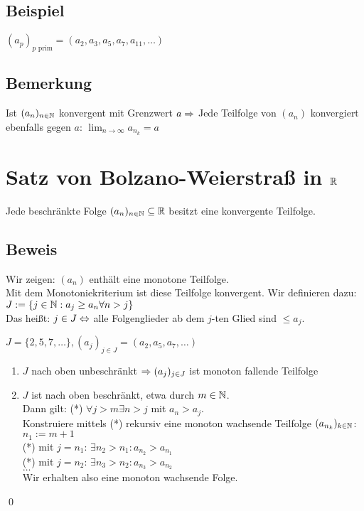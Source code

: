 \subsection*{Beispiel}
$(a_p)_{p \text{ prim}} = (a_2, a_3, a_5, a_7, a_{11}, \hdots)$

\subsection*{Bemerkung}
Ist $(a_n)_{n \in \mathbb{N}}$ konvergent mit Grenzwert $a \Rightarrow$ Jede Teilfolge von $(a_n)$ konvergiert ebenfalls gegen $a$: $\lim_{n \to \infty} a_{n_k} = a$

\section{\texorpdfstring{Satz von Bolzano-Weierstraß in $\mathbb{R}$}{Satz von Bolzano-Weierstraß in \R}}\label{5.12}
Jede beschränkte Folge $(a_n)_{n \in \mathbb{N}} \subseteq \mathbb{R}$ besitzt eine konvergente Teilfolge.

\subsection*{Beweis}
Wir zeigen: $(a_n)$ enthält eine monotone Teilfolge.\\
Mit dem Monotoniekriterium ist diese Teilfolge konvergent.\nl
Wir definieren dazu: $J := \{j \in \mathbb{N}: a_j \ge a_n \forall n > j\}$\\
Das heißt: $j \in J \Leftrightarrow$ alle Folgenglieder ab dem $j$-ten Glied sind $\le a_j$.\nl
{}
$J = \{2,5,7,\hdots\}, (a_j)_{j \in J} = (a_2, a_5, a_7, \hdots)$
\begin{enumerate}[label=\arabic*. Fall:]
\item $J$ nach oben unbeschränkt $\Rightarrow (a_j)_{j \in J}$ ist monoton fallende Teilfolge
\item $J$ ist nach oben beschränkt, etwa durch $m \in \mathbb{N}$.\\
Dann gilt: (*) $\forall j>m \exists n>j$ mit $a_n > a_j$.\\
Konstruiere mittels (*) rekursiv eine monoton wachsende Teilfolge $(a_{n_k})_{k \in \mathbb{N}}$:\\
$n_1 := m+1$\\
(*) mit $j=n_1$: $\exists n_2 > n_1: a_{n_2} > a_{n_1}$\\
(*) mit $j=n_2$: $\exists n_3 > n_2: a_{n_3} > a_{n_2}$\\
$\hdots$\\
Wir erhalten also eine monoton wachsende Folge.
\end{enumerate} \qed